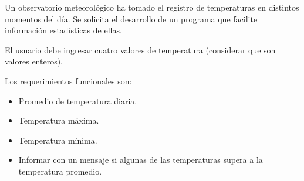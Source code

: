 Un observatorio meteorológico ha tomado el registro de temperaturas en distintos momentos del día. Se solicita el desarrollo de un programa que facilite información estadísticas de ellas.

El usuario debe ingresar cuatro valores de temperatura (considerar que son valores enteros).

Los requerimientos funcionales son:

\begin{itemize}
\item Promedio de temperatura diaria.
\item Temperatura máxima.
\item Temperatura mínima.
\item Informar con un mensaje si algunas de las temperaturas supera a la temperatura promedio.
\end{itemize}